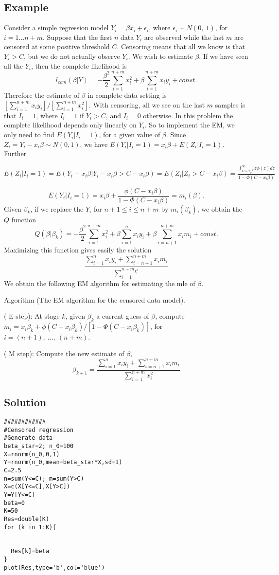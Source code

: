 \documentclass[12pt]{article}
\begin{document}
\subsection*{Example}
Consider a simple regression model $Y_{i}=\beta x_{i}+\epsilon_{i}$, where $\epsilon_{i}\sim N(0,\ 1)$, for $ i=1\ldots n+m$. 
Suppose that the first $n$ data $Y_{i}$ are observed while the last $m$ are censored at some positive threshold $C$. 
Censoring means that all we know is that $Y_{i}>C$, but we do not actually observe $Y_{i}$. 
We wish to estimate $\beta$. If we have seen all the $Y_{i}$, then the complete likelihood is
$$
l_{com}(\beta|Y)=-\frac{\beta^{2}}{2}\sum_{i=1}^{n+m}x_{i}^{2}+\beta\sum_{i=1}^{n+m}x_{i}y_{i}+const.
$$
Therefore the estimate of $\beta$ in complete data setting is $[\displaystyle \sum_{i=1}^{n+m}x_{i}y_{i}]/[\sum_{i=1}^{n+m}x_{i}^{2}]$. With censoring, all we see on the last $m$ samples is that $I_{i}=1$, where $I_{i}=1$ if $Y_{i}>C$, and $I_{i}=0$ otherwise. In this problem the complete likelihood depends only linearly on $Y_{i}$. So to implement the EM, we only need to find $E(Y_{i}|I_{i}=1)$, for a given value of $\beta$. Since $Z_{i}=Y_{i}-x_{i}\beta\sim N(0,1)$, we have $E(Y_{i}|I_{i}=1)=x_{i}\beta+E(Z_{i}|I_{i}=1)$. Further

$E(Z_{i}|I_{i}=1)=E(Y_{i}-x_{i}\displaystyle \beta|Y_{i}-x_{i}\beta>C-x_{i}\beta)=E(Z_{i}|Z_{i}>C-x_{i}\beta)=\frac{\int_{C-x_{i}\beta}^{\infty}z\phi(z)dz}{1-\Phi(C-x_{i}\beta)}$

$$
E(Y_{i}|I_{i}=1)=x_{i}\beta+\frac{\phi(C-x_{i}\beta)}{1-\Phi(C-x_{i}\beta)}=m_{i}(\beta).
$$
Given $\beta_{k}$, if we replace the $Y_{i}$ for $n+1\leq i\leq n+m$ by $m_{i}(\beta_{k})$, we obtain the $Q$ function
$$
Q(\beta|\beta_{k})=-\frac{\beta^{2}}{2}\sum_{i=1}^{n+m}x_{i}^{2}+\beta\sum_{i=1}^{n}x_{i}y_{i}+\beta\sum_{i=n+1}^{n+m}x_{i}m_{i}+const.
$$
Maximizing this function gives easily the solution
$$
\frac{\sum_{i=1}^{n}x_{i}y_{i}+\sum_{i=n+1}^{n+m}x_{i}m_{i}}{\sum_{i=1}^{n+m_{\chi_{i}^{2}}}}
$$
We obtain the following EM algorithm for estimating the mle of $\beta$.

Algorithm (The EM algorithm for the censored data model).

( $\mathrm{E}$ step): At stage $k$, given $\beta_{k}$ a current guess of $\beta$, compute $m_{i}=x_{i}\beta_{k}+\phi(C-x_{i}\beta_{k})/[1-\Phi(C-x_{i}\beta_{k})]$, for $i=(n+1),\ \ldots,\ (n+m)$.

( $\mathrm{M}$ step): Compute the new estimate of $\beta$,
$$
\beta_{k+1}=\frac{\sum_{i=1}^{n}x_{i}y_{i}+\sum_{i=n+1}^{n+m}x_{i}m_{i}}{\sum_{i=1}^{n+m}x_{i}^2}
$$
\subsection*{Solution}

\begin{verbatim}
############
#Censored regression
#Generate data
beta_star=2; n_0=100
X=rnorm(n_0,0,1)
Y=rnorm(n_0,mean=beta_star*X,sd=1)
C=2.5
n=sum(Y<=C); m=sum(Y>C)
X=c(X[Y<=C],X[Y>C])
Y=Y[Y<=C]
beta=0
K=50
Res=double(K)
for (k in 1:K){
  
  
  Res[k]=beta
}
plot(Res,type='b',col='blue')

\end{verbatim}
\end{document}
